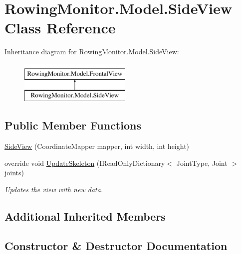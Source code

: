 \hypertarget{class_rowing_monitor_1_1_model_1_1_side_view}{}\section{Rowing\+Monitor.\+Model.\+Side\+View Class Reference}
\label{class_rowing_monitor_1_1_model_1_1_side_view}
Inheritance diagram for Rowing\+Monitor.\+Model.\+Side\+View\+:\begin{figure}[H]
\begin{center}
\leavevmode
\includegraphics[height=2.000000cm]{class_rowing_monitor_1_1_model_1_1_side_view}
\end{center}
\end{figure}
\subsection*{Public Member Functions}
\begin{DoxyCompactItemize}
\item 
\hyperlink{class_rowing_monitor_1_1_model_1_1_side_view_af647d9e21d8e6add558e57ccc31555f2}{Side\+View} (Coordinate\+Mapper mapper, int width, int height)
\item 
override void \hyperlink{class_rowing_monitor_1_1_model_1_1_side_view_a2cfba6b08a666c71ed25a3cbeaabe138}{Update\+Skeleton} (I\+Read\+Only\+Dictionary$<$ Joint\+Type, Joint $>$ joints)
\begin{DoxyCompactList}\small\item\em Updates the view with new data. \end{DoxyCompactList}\end{DoxyCompactItemize}
\subsection*{Additional Inherited Members}


\subsection{Constructor \& Destructor Documentation}
\mbox{\label{class_rowing_monitor_1_1_model_1_1_side_view_af647d9e21d8e6add558e57ccc31555f2}} 
